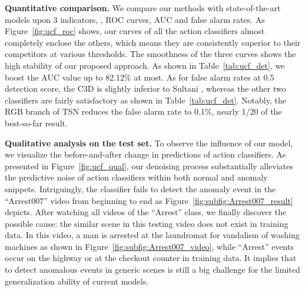 \documentclass[10pt,twocolumn,letterpaper]{article}
\begin{document}
\begin{figure*}[h]
  \centering
  
    
\caption{\emph{Visualization of testing results on UCF-Crime.} The blue curves are predictions of the action classifier trained under video-level labels, and the orange curves are the results under cleaned supervision. The ``GT'' bars in green are ground truths. {\color{cyan}{Best viewed in Adobe Reader where (d) should play as a video.}}} 
  \label{fig:ucf_qual} 
\end{figure*}


\textbf{Quantitative comparison.}
We compare our methods with state-of-the-art models upon 3 indicators, \ie, ROC curves, AUC and false alarm rates. As Figure~\ref{fig:ucf_roc} shows, our curves of all the action classifiers almost completely enclose the others, which means they are consistently superior to their competitors at various thresholds. The smoothness of the three curves shows the high stability of our proposed approach. As shown in Table~\ref{tab:ucf_det}, we boost the AUC value up to 82.12\% at most. As for false alarm rates at 0.5 detection score, the C3D is slightly inferior to Sultani \etal, whereas the other two classifiers are fairly satisfactory as shown in Table~\ref{tab:ucf_det}. Notably, the RGB branch of TSN reduces the false alarm rate to 0.1\%, nearly 1/20 of the best-so-far result.  

\textbf{Qualitative analysis on the test set.}
To observe the influence of our model, we visualize the before-and-after change in predictions of action classifiers. As presented in Figure~\ref{fig:ucf_qual}, our denoising process substantially alleviates the predictive noise of action classifiers within both normal and anomaly snippets. Intriguingly, the classifier fails to detect the anomaly event in the ``Arrest007'' video from beginning to end as Figure~\ref{fig:subfig:Arrest007_result} depicts. After watching all videos of the ``Arrest'' class, we finally discover the possible cause: the similar scene in this testing video does not exist in training data. In this video, a man is arrested at the laundromat for vandalism of washing machines as shown in Figure~\ref{fig:subfig:Arrest007_video}, while ``Arrest'' events occur on the highway or at the checkout counter in training data. It implies that to detect anomalous events in generic scenes is still a big challenge for the limited generalization ability of current models.  
\end{document}
